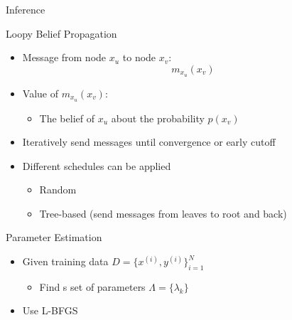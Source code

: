 \documentclass[presentation,bigger]{beamer}
\begin{document}
\begin{frame}[label={sec:orgheadline18}]{Inference}
\begin{block}{Loopy Belief Propagation}
\begin{itemize}
\item Message from node \(x_u\) to node \(x_v\):
\[ m_{x_u}(x_v) \]
\item Value of \(m_{x_u}(x_v)\):
\begin{itemize}
\item The belief of \(x_u\) about the probability \(p(x_v)\)
\end{itemize}
\item Iteratively send messages until convergence or early cutoff
\item Different schedules can be applied
\begin{itemize}
\item Random
\item Tree-based (send messages from leaves to root and back)
\end{itemize}
\end{itemize}
\end{block}
\end{frame}
\begin{frame}[label={sec:orgheadline19}]{Parameter Estimation}
\begin{itemize}
\item Given training data \(D = \{x^{(i)},y^{(i)}\}^N_{i=1}\)
\begin{itemize}
\item Find s set of parameters \(\Lambda = \{\lambda_k\}\)
\end{itemize}
\item Use L-BFGS
\end{itemize}
\end{frame}
\end{document}
